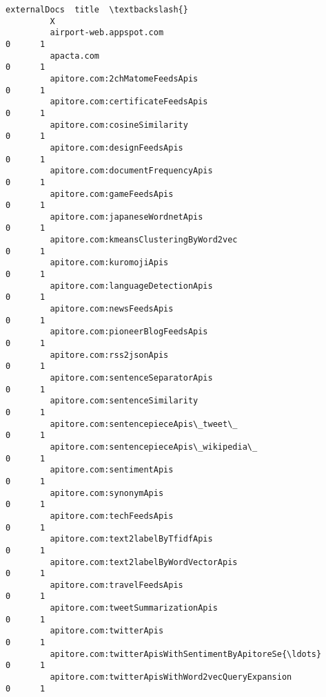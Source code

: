\documentclass[11pt]{article}
\begin{document}
\begin{Verbatim}[commandchars=\\\{\}]
                                                             externalDocs  title  \textbackslash{}
         X                                                                         
         airport-web.appspot.com                                        0      1   
         apacta.com                                                     0      1   
         apitore.com:2chMatomeFeedsApis                                 0      1   
         apitore.com:certificateFeedsApis                               0      1   
         apitore.com:cosineSimilarity                                   0      1   
         apitore.com:designFeedsApis                                    0      1   
         apitore.com:documentFrequencyApis                              0      1   
         apitore.com:gameFeedsApis                                      0      1   
         apitore.com:japaneseWordnetApis                                0      1   
         apitore.com:kmeansClusteringByWord2vec                         0      1   
         apitore.com:kuromojiApis                                       0      1   
         apitore.com:languageDetectionApis                              0      1   
         apitore.com:newsFeedsApis                                      0      1   
         apitore.com:pioneerBlogFeedsApis                               0      1   
         apitore.com:rss2jsonApis                                       0      1   
         apitore.com:sentenceSeparatorApis                              0      1   
         apitore.com:sentenceSimilarity                                 0      1   
         apitore.com:sentencepieceApis\_tweet\_                           0      1   
         apitore.com:sentencepieceApis\_wikipedia\_                       0      1   
         apitore.com:sentimentApis                                      0      1   
         apitore.com:synonymApis                                        0      1   
         apitore.com:techFeedsApis                                      0      1   
         apitore.com:text2labelByTfidfApis                              0      1   
         apitore.com:text2labelByWordVectorApis                         0      1   
         apitore.com:travelFeedsApis                                    0      1   
         apitore.com:tweetSummarizationApis                             0      1   
         apitore.com:twitterApis                                        0      1   
         apitore.com:twitterApisWithSentimentByApitoreSe{\ldots}             0      1   
         apitore.com:twitterApisWithWord2vecQueryExpansion              0      1   

\end{Verbatim}
\end{document}
